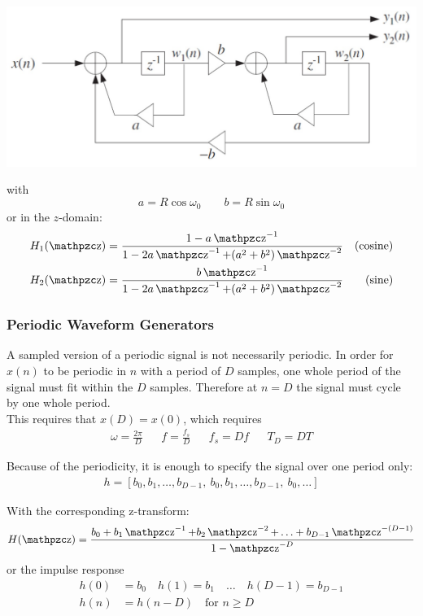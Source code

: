 \begin{center} %
	\includegraphics[width=\linewidth]{images/SignProcApp_SinCoupledForm.jpg}
\end{center}
with
\begin{equation*}
	a = R \cos \omega_0 \qquad b = R \sin \omega_0
\end{equation*}
or in the $z$-domain:
\begin{align*}
	H_1(\z) &= \frac{1 - a \z^{-1}}{1 - 2 a \z^{-1} + (a^2+b^2) \z^{-2}}  &\text{(cosine)} \\
	H_2(\z) &= \frac{b \z^{-1}}{1 - 2 a \z^{-1} + (a^2+b^2) \z^{-2}} &\text{(sine)}
\end{align*}

\subsubsection{Periodic Waveform Generators}
A sampled version of a periodic signal is not necessarily periodic. 
In order for $x(n)$ to be periodic in $n$ with a period of $D$ samples,
one whole period of the signal must fit within the $D$ samples. 
Therefore at $n = D$ the signal must cycle by one whole period. \\

This requires that $x(D) = x(0)$, which requires
\begin{align*}
	\omega = \frac{2\pi}{D} && f = \frac{f_s}{D} && f_s = Df && T_D = DT
\end{align*}


Because of the periodicity, it is enough to specify the signal over one period only:
\begin{align*}
	h = [b_0, b_1, \ldots, b_{D-1}, \: b_0, b_1, \ldots, b_{D-1}, \: b_0, \ldots]
\end{align*}

With the corresponding z-transform:
\begin{align*}
	H(\z) = \frac{b_0 + b_1 \z^{-1} + b_2 \z^{-2} + \ldots + b_{D-1} \z^{-(D-1)}}{1 - \z^{-D}}
\end{align*}
or the impulse response
\begin{align*}
	h(0) &= b_0 \quad h(1) = b_1 \quad \ldots \quad h(D-1) = b_{D-1} \\
	h(n) &= h(n-D) \quad \text{for } n \geq D
\end{align*}

